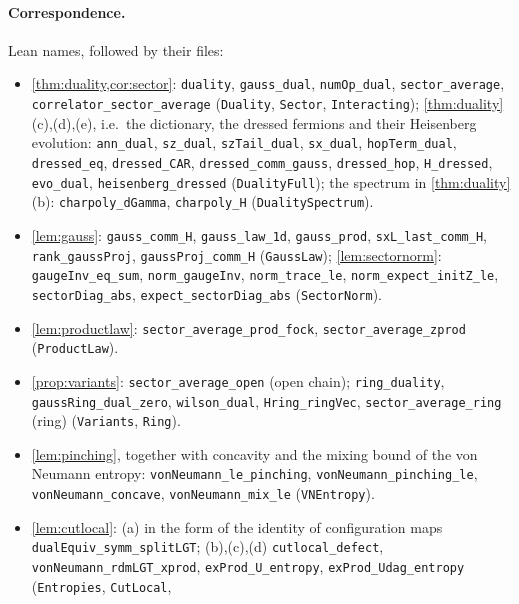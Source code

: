 \paragraph{Correspondence.}  Lean names, followed by their files:
\begin{itemize}[leftmargin=1.5em,itemsep=1pt]
\item \cref{thm:duality,cor:sector}: \texttt{duality}, \texttt{gauss\_dual},
\texttt{numOp\_dual}, \texttt{sector\_average}, \texttt{correlator\_sector\_average} (\texttt{Duality}, \texttt{Sector},
\texttt{Interacting}); \cref{thm:duality}(c),(d),(e),
i.e.\ the dictionary, the dressed fermions and their Heisenberg evolution: \texttt{ann\_dual}, \texttt{sz\_dual},
\texttt{szTail\_dual}, \texttt{sx\_dual}, \texttt{hopTerm\_dual}, \texttt{dressed\_eq}, \texttt{dressed\_CAR},
\texttt{dressed\_comm\_gauss}, \texttt{dressed\_hop}, \texttt{H\_dressed}, \texttt{evo\_dual},
\texttt{heisenberg\_dressed} (\texttt{DualityFull}); the spectrum in \cref{thm:duality}(b):
\texttt{charpoly\_dGamma}, \texttt{charpoly\_H} (\texttt{DualitySpectrum}).
\item \cref{lem:gauss}: \texttt{gauss\_comm\_H}, \texttt{gauss\_law\_1d}, \texttt{gauss\_prod},
\texttt{sxL\_last\_comm\_H}, \texttt{rank\_gaussProj}, \texttt{gaussProj\_comm\_H} (\texttt{GaussLaw});
\cref{lem:sectornorm}: \texttt{gaugeInv\_eq\_sum}, \texttt{norm\_gaugeInv}, \texttt{norm\_trace\_le},
\texttt{norm\_expect\_initZ\_le}, \texttt{sectorDiag\_abs}, \texttt{expect\_sectorDiag\_abs} (\texttt{SectorNorm}).
\item \cref{lem:productlaw}: \texttt{sector\_average\_prod\_fock}, \texttt{sector\_average\_zprod}
(\texttt{ProductLaw}).
\item \cref{prop:variants}: \texttt{sector\_average\_open} (open chain); \texttt{ring\_duality},
\texttt{gaussRing\_dual\_zero}, \texttt{wilson\_dual}, \texttt{Hring\_ringVec},
\texttt{sector\_average\_ring} (ring) (\texttt{Variants}, \texttt{Ring}).
\item \cref{lem:pinching}, together with concavity and the mixing bound of the von Neumann entropy:
\texttt{vonNeumann\_le\_pinching}, \texttt{vonNeumann\_pinching\_le}, \texttt{vonNeumann\_concave},
\texttt{vonNeumann\_mix\_le} (\texttt{VNEntropy}).
\item \cref{lem:cutlocal}: (a) in the form of the identity of configuration maps
\texttt{dualEquiv\_symm\_splitLGT}; (b),(c),(d) \texttt{cutlocal\_defect}, \texttt{vonNeumann\_rdmLGT\_xprod},
\texttt{exProd\_U\_entropy}, \texttt{exProd\_Udag\_entropy} (\texttt{Entropies}, \texttt{CutLocal},

\end{itemize}
